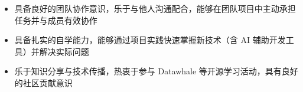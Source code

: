 \documentclass[UTF8,AutoFakeBold]{resume}
\begin{document}
\begin{itemize}
    \item \kaishu 具备良好的团队协作意识，乐于与他人沟通配合，能够在团队项目中主动承担任务并与成员有效协作
    \item \kaishu 具备扎实的自学能力，能够通过项目实践快速掌握新技术（含 AI 辅助开发工具）并解决实际问题
    \item \kaishu 乐于知识分享与技术传播，热衷于参与 Datawhale 等开源学习活动，具有良好的社区贡献意识
\end{itemize}


\end{document}
